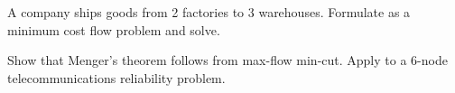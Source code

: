 \begin{exercise}
A company ships goods from 2 factories to 3 warehouses. Formulate as a
minimum cost flow problem and solve.
\end{exercise}

\begin{exercise}
Show that Menger's theorem follows from max-flow min-cut. Apply to a
6-node telecommunications reliability problem.
\end{exercise}
